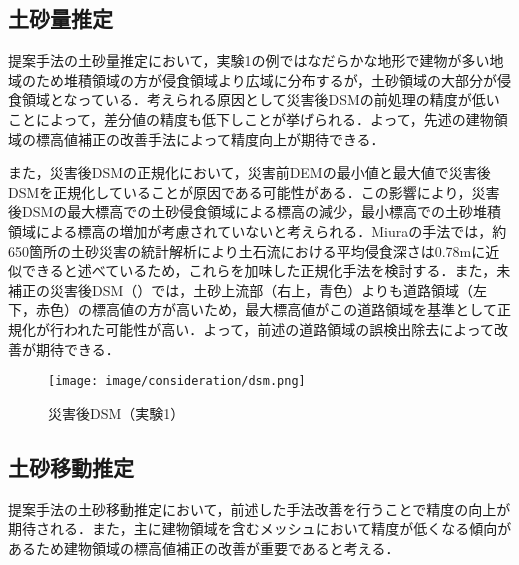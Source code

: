     \subsection*{土砂量推定}
      提案手法の土砂量推定において，実験1の例ではなだらかな地形で建物が多い地域のため堆積領域の方が侵食領域より広域に分布するが，土砂領域の大部分が侵食領域となっている．考えられる原因として災害後DSMの前処理の精度が低いことによって，差分値の精度も低下しことが挙げられる．よって，先述の建物領域の標高値補正の改善手法によって精度向上が期待できる．
      
      また，災害後DSMの正規化において，災害前DEMの最小値と最大値で災害後DSMを正規化していることが原因である可能性がある．この影響により，災害後DSMの最大標高での土砂侵食領域による標高の減少，最小標高での土砂堆積領域による標高の増加が考慮されていないと考えられる．Miuraの手法\cite{土砂量解析5}では，約650箇所の土砂災害の統計解析により土石流における平均侵食深さは0.78mに近似できると述べているため，これらを加味した正規化手法を検討する．また，未補正の災害後DSM（）では，土砂上流部（右上，青色）よりも道路領域（左下，赤色）の標高値の方が高いため，最大標高値がこの道路領域を基準として正規化が行われた可能性が高い．よって，前述の道路領域の誤検出除去によって改善が期待できる．
      
      \begin{figure}[tbp]
        \centering
        \texttt{[image: image/consideration/dsm.png]}
        \caption{災害後DSM（実験1）}
        \label{災害後DSM（実験1）}
      \end{figure}


    \subsection*{土砂移動推定}
      提案手法の土砂移動推定において，前述した手法改善を行うことで精度の向上が期待される．また，主に建物領域を含むメッシュにおいて精度が低くなる傾向があるため建物領域の標高値補正の改善が重要であると考える．
